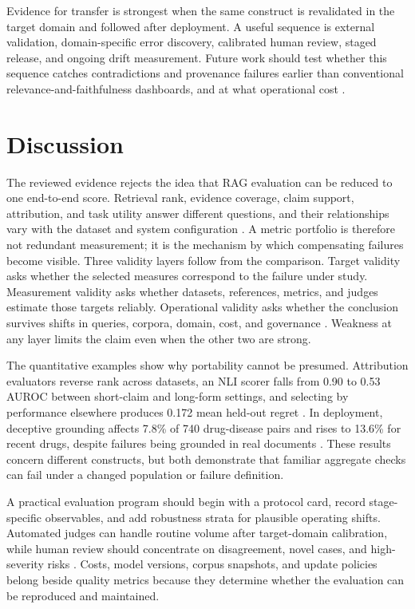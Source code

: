 \documentclass[a4paper,11pt]{article}
\begin{document}
Evidence for transfer is strongest when the same construct is revalidated in the target domain and followed after deployment. A useful sequence is external validation, domain-specific error discovery, calibrated human review, staged release, and ongoing drift measurement. Future work should test whether this sequence catches contradictions and provenance failures earlier than conventional relevance-and-faithfulness dashboards, and at what operational cost \citep{Cahoon2025Optimizing,Javadi2025Contradictions,Zhou2024Trustworthiness}.
\section{Discussion}


The reviewed evidence rejects the idea that RAG evaluation can be reduced to one end-to-end score. Retrieval rank, evidence coverage, claim support, attribution, and task utility answer different questions, and their relationships vary with the dataset and system configuration \citep{Taiwo2026Evaluating,Ding2026Attribution,Caruzzo2026Deceptive}. A metric portfolio is therefore not redundant measurement; it is the mechanism by which compensating failures become visible. Three validity layers follow from the comparison. Target validity asks whether the selected measures correspond to the failure under study. Measurement validity asks whether datasets, references, metrics, and judges estimate those targets reliably. Operational validity asks whether the conclusion survives shifts in queries, corpora, domain, cost, and governance \citep{SaadFalcon2023Ares,Zhang2026Before,Muthyam2026Systems,Javadi2025Contradictions}. Weakness at any layer limits the claim even when the other two are strong.

The quantitative examples show why portability cannot be presumed. Attribution evaluators reverse rank across datasets, an NLI scorer falls from 0.90 to 0.53 AUROC between short-claim and long-form settings, and selecting by performance elsewhere produces 0.172 mean held-out regret \citep{Ding2026Attribution}. In deployment, deceptive grounding affects 7.8\% of 740 drug-disease pairs and rises to 13.6\% for recent drugs, despite failures being grounded in real documents \citep{Caruzzo2026Deceptive}. These results concern different constructs, but both demonstrate that familiar aggregate checks can fail under a changed population or failure definition.

A practical evaluation program should begin with a protocol card, record stage-specific observables, and add robustness strata for plausible operating shifts. Automated judges can handle routine volume after target-domain calibration, while human review should concentrate on disagreement, novel cases, and high-severity risks \citep{Murugaraj2025Ragvue,Brehme2025Retrieval}. Costs, model versions, corpus snapshots, and update policies belong beside quality metrics because they determine whether the evaluation can be reproduced and maintained.
\end{document}
